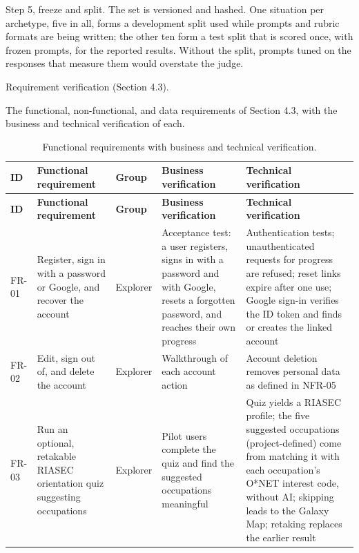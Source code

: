 Step 5, freeze and split. The set is versioned and hashed. One situation per archetype, five in all, forms a development split used while prompts and rubric formats are being written; the other ten form a test split that is scored once, with frozen prompts, for the reported results. Without the split, prompts tuned on the responses that measure them would overstate the judge.

Requirement verification (Section 4.3).

The functional, non-\allowbreak{}functional, and data requirements of Section 4.3, with the business and technical verification of each.

{\small{}\renewcommand{\arraystretch}{1.1}
\begin{longtable}{|>{\raggedright\arraybackslash}p{}|>{\raggedright\arraybackslash}p{}|>{\raggedright\arraybackslash}p{}|>{\raggedright\arraybackslash}p{}|>{\raggedright\arraybackslash}p{}|}
\caption{Functional requirements with business and technical verification.} \\
\hline
\textbf{ID} & \textbf{Functional requirement} & \textbf{Group} & \textbf{Business verification} & \textbf{Technical verification} \\ \hline
\endfirsthead
\hline
\textbf{ID} & \textbf{Functional requirement} & \textbf{Group} & \textbf{Business verification} & \textbf{Technical verification} \\ \hline
\endhead
FR-01 & Register, sign in with a password or Google, and recover the account & Explorer & Acceptance test: a user registers, signs in with a password and with Google, resets a forgotten password, and reaches their own progress & Authentication tests; unauthenticated requests for progress are refused; reset links expire after one use; Google sign-in verifies the ID token and finds or creates the linked account \\ \hline
FR-02 & Edit, sign out of, and delete the account & Explorer & Walkthrough of each account action & Account deletion removes personal data as defined in NFR-05 \\ \hline
FR-03 & Run an optional, retakable RIASEC orientation quiz suggesting occupations\cite{r41} & Explorer & Pilot users complete the quiz and find the suggested occupations meaningful & Quiz yields a RIASEC profile; the five suggested occupations (project-\allowbreak{}defined) come from matching it with each occupation's O*NET interest code, without AI; skipping leads to the Galaxy Map; retaking replaces the earlier result \\ \hline

\end{longtable}}
